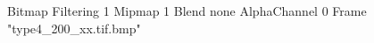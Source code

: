 {Bitmap
	{Filtering 1}
	{Mipmap 1}
	{Blend none}
	{AlphaChannel 0}
	{Frame "type4_200_xx.tif.bmp"}
}

